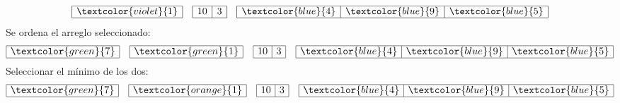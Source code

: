 \documentclass{article}
\begin{document}
\begin{minipage}{0.5\textwidth}
\begin{equation*}
    \begin{array}{|r|}
      \hline \textcolor{violet}{1} \\ \hline
    \end{array} \quad 
    \begin{array}{|r|r|}
      \hline 10 & 3 \\ \hline
    \end{array}\quad 
    \begin{array}{|r|r|r|}
      \hline \textcolor{blue}{4} & \textcolor{blue}{9} & \textcolor{blue}{5} \\ \hline
    \end{array}
  \end{equation*}
  Se ordena el arreglo seleccionado:
  \begin{equation*}
    \large
    \begin{array}{|r|}
      \hline \textcolor{green}{7} \\ \hline
    \end{array} \quad 
    \begin{array}{|r|}
      \hline \textcolor{green}{1} \\ \hline
    \end{array} \quad 
    \begin{array}{|r|r|}
      \hline 10 & 3 \\ \hline
    \end{array}\quad 
    \begin{array}{|r|r|r|}
      \hline \textcolor{blue}{4} & \textcolor{blue}{9} & \textcolor{blue}{5} \\ \hline
    \end{array}
  \end{equation*}
  Seleccionar el mínimo de los dos:
  \begin{equation*}
    \large
    \begin{array}{|r|}
      \hline \textcolor{green}{7} \\ \hline
    \end{array} \quad 
    \begin{array}{|r|}
      \hline \textcolor{orange}{1} \\ \hline
    \end{array} \quad 
    \begin{array}{|r|r|}
      \hline 10 & 3 \\ \hline
    \end{array}\quad 
    \begin{array}{|r|r|r|}
      \hline \textcolor{blue}{4} & \textcolor{blue}{9} & \textcolor{blue}{5} \\ \hline

\end{array}
\end{equation*}
\end{minipage}
\end{document}
